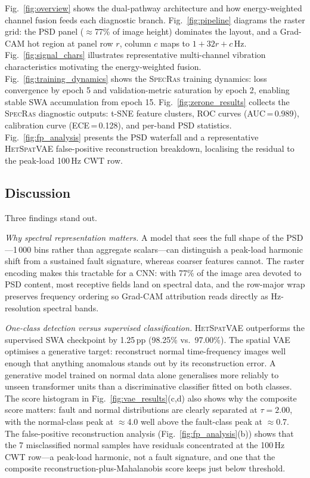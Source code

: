 \documentclass[preprint,12pt,3p]{elsarticle}
\newcommand{\zerone}{\textsc{SpecRas}\xspace}      %
\newcommand{\hetspatvae}{\textsc{HetSpatVAE}\xspace} %
\newcommand{\hczv}{\hetspatvae}                    %
\begin{document}
Fig.~\ref{fig:overview} shows the dual-pathway architecture and how
energy-weighted channel fusion feeds each diagnostic branch.
Fig.~\ref{fig:pipeline} diagrams the raster grid: the PSD panel
($\approx$77\% of image height) dominates the layout, and a Grad-CAM
hot region at panel row $r$, column $c$ maps to $1 + 32r + c$\,Hz.
Fig.~\ref{fig:signal_chars} illustrates representative multi-channel
vibration characteristics motivating the energy-weighted fusion.
Fig.~\ref{fig:training_dynamics} shows the \zerone training dynamics:
loss convergence by epoch 5 and validation-metric saturation by
epoch 2, enabling stable SWA accumulation from epoch 15.
Fig.~\ref{fig:zerone_results} collects the \zerone diagnostic outputs:
t-SNE feature clusters, ROC curves (AUC\,=\,0.989), calibration
curve (ECE\,=\,0.128), and per-band PSD statistics.
Fig.~\ref{fig:fp_analysis} presents the PSD waterfall and a
representative \hczv false-positive reconstruction breakdown,
localising the residual to the peak-load 100\,Hz CWT row.

\subsection{Discussion}
\label{sec:discussion}

Three findings stand out.

\textit{Why spectral representation matters.}
A model that sees the full shape of the PSD---1\,000 bins rather than
aggregate scalars---can distinguish a peak-load harmonic shift from a
sustained fault signature, whereas coarser features cannot.
The raster encoding makes this tractable for a CNN: with 77\% of the
image area devoted to PSD content, most receptive fields land on
spectral data, and the row-major wrap preserves frequency ordering so
Grad-CAM attribution reads directly as Hz-resolution spectral bands.

\textit{One-class detection versus supervised classification.}
\hczv outperforms the supervised SWA checkpoint by 1.25\,pp
(98.25\% vs.\ 97.00\%).
The spatial VAE optimises a generative target: reconstruct normal
time-frequency images well enough that anything anomalous stands out
by its reconstruction error.
A generative model trained on normal data alone generalises more
reliably to unseen transformer units than a discriminative classifier
fitted on both classes.
The score histogram in Fig.~\ref{fig:vae_results}(c,d) also
shows why the composite score matters: fault and normal distributions
are clearly separated at $\tau=2.00$, with the normal-class peak at
$\approx$4.0 well above the fault-class peak at $\approx$0.7.
The false-positive reconstruction analysis (Fig.~\ref{fig:fp_analysis}(b))
shows that the 7 misclassified normal samples have residuals concentrated
at the 100\,Hz CWT row---a peak-load harmonic, not a fault signature,
and one that the composite reconstruction-plus-Mahalanobis score keeps
just below threshold.
\end{document}
